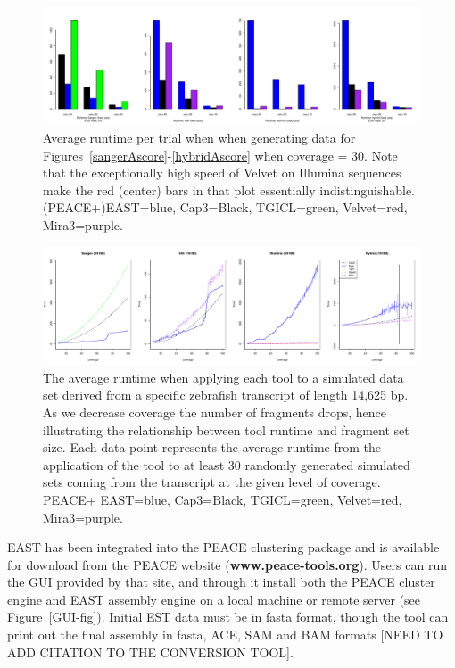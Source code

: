\documentclass[10pt]{bmc_article}
\newcommand{\peace} {{\small PEACE}}
\newcommand{\capthree} {{\small Cap3}}
\newcommand{\tgicl} {{\small TGICL}}
\newcommand{\east} {{\small EAST}}
\newcommand{\velvet}{{\small Velvet}}
\newcommand{\mira}{{\small Mira3}}
\newenvironment{bmcformat}{\begin{raggedright}\baselineskip20pt\sloppy\setboolean{publ}{false}}{\end{raggedright}\baselineskip20pt\sloppy}
\begin{document}
\begin{bmcformat}
\begin{figure}[htb]
\centerline{\includegraphics[width=6in]{pics.d/runtime_fixedsize_sanger.pdf}}
\caption{Average runtime per trial when when generating data for
  Figures~\ref{sangerAscore}-\ref{hybridAscore}  when coverage = 30.
  Note that the exceptionally high speed of \velvet\/ on Illumina sequences make the
  red (center) bars in that plot essentially indistinguishable.
  (\peace+)\east=blue, \capthree=Black, \tgicl=green,
  \velvet=red, \mira=purple.}
\label{runtime.fixed}
\end{figure}

\begin{figure}[htb]
\centerline{\includegraphics[width=6in]{pics.d/runtime_bycoverage_all.pdf}}
\caption{The average runtime when applying each tool to a simulated
  data set derived from a specific zebrafish transcript of length
  14,625 bp.  As we decrease coverage the number of fragments drops,
  hence illustrating the relationship between tool runtime and
  fragment set size.  Each data point represents the average runtime
  from the application of the tool to at least 30 randomly generated
  simulated sets coming from the transcript at the given level of coverage.
  \peace + \east=blue, \capthree=Black, \tgicl=green,
  \velvet=red, \mira=purple.}
\label{runtime.coverage}
\end{figure}

 \east\/ has been integrated into the
\peace\/ clustering package \cite{Rao10} and is available for
download from the \peace\/ website ({\bf www.peace-tools.org}).
Users can run the GUI provided by that site, and through it
install both the \peace\/ cluster engine and \east\/ assembly engine
on a local machine or remote server (see Figure~\ref{GUI-fig}).
Initial EST data must be in fasta format, though the tool can print
out the final assembly in fasta, ACE, SAM and BAM formats [NEED TO ADD
CITATION TO THE CONVERSION TOOL].


\end{bmcformat}
\end{document}
